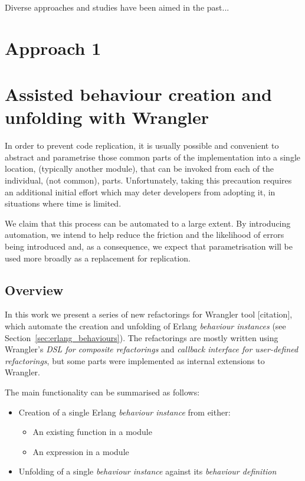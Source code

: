 Diverse approaches and studies have been aimed in the past...

\section{Approach 1}
\label{approach1}

\section{Assisted behaviour creation and unfolding with Wrangler}

In order to prevent code replication, it is usually possible and
convenient to abstract and parametrise those common parts of the implementation
into a single location, (typically another module), that can be invoked
from each of the individual, (not common), parts. Unfortunately, taking
this precaution requires an additional initial effort which may deter
developers from adopting it, in situations where time is limited.

We claim that this process can be automated to a large extent. By
introducing automation, we intend to help reduce the friction and
the likelihood of errors being introduced and, as a consequence, we
expect that parametrisation will be used more broadly as a replacement
for replication.

\subsection{Overview}

In this work we present a series of new refactorings for Wrangler tool
[citation], which automate the creation and unfolding of Erlang \emph{behaviour
instances} (see Section~\ref{sec:erlang_behaviours}). The refactorings
are mostly written using Wrangler's \emph{DSL for composite refactorings}
and \emph{callback interface for user-defined refactorings}, but some
parts were implemented as internal extensions to Wrangler.

The main functionality can be summarised as follows:
\begin{itemize}
\item Creation of a single Erlang \emph{behaviour instance} from either:

\begin{itemize}
\item An existing function in a module
\item An expression in a module
\end{itemize}
\item Unfolding of a single \emph{behaviour instance} against its \emph{behaviour
definition}
\end{itemize}


